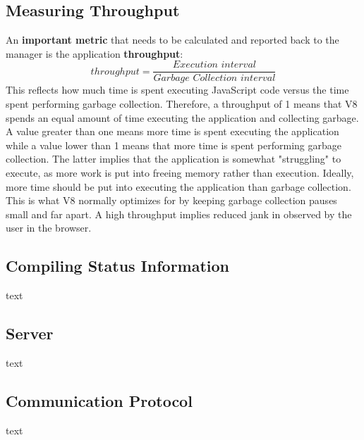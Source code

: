 \documentclass{l4proj}
\begin{document}
\subsection{Measuring Throughput}
\hspace*{3em} An \textbf{important metric} that needs to be calculated and reported back to the manager is the application \textbf{throughput}:
\begin{equation}
throughput = \frac{\textit{Execution interval}}{\textit{Garbage Collection interval}}
\end{equation}
\hspace*{3em} This reflects how much time is spent executing JavaScript code versus the time spent performing garbage collection. Therefore, a throughput of 1 means that V8 spends an equal amount of time executing the application and collecting garbage. A value greater than one means more time is spent executing the application while a value lower than 1 means that more time is spent performing garbage collection. The latter implies that the application is somewhat "struggling" to execute, as more work is put into freeing memory rather than execution.
Ideally, more time should be put into executing the application than garbage collection. This is what V8 normally optimizes for by keeping garbage collection pauses small and far apart. A high throughput implies reduced jank in observed by the user in the browser.
\subsection{Compiling Status Information}
text
\subsection{Server}
text
\subsection{Communication Protocol}
text
\end{document}
